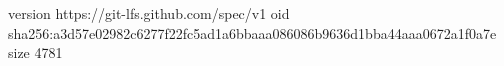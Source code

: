 version https://git-lfs.github.com/spec/v1
oid sha256:a3d57e02982c6277f22fc5ad1a6bbaaa086086b9636d1bba44aaa0672a1f0a7e
size 4781
